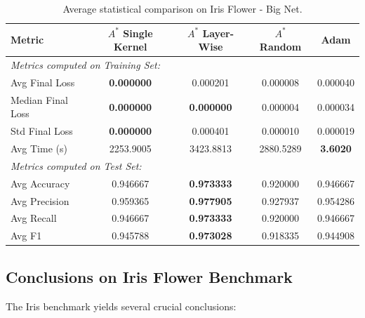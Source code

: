 \begin{table}[htbp]
\centering
\scriptsize
\begin{tabular}{|l|c|c|c|c|}
\hline
\textbf{Metric}   & \textbf{$A^*$ Single Kernel} & \textbf{$A^*$ Layer-Wise} & \textbf{$A^*$ Random} & \textbf{Adam} \\ \hline
\multicolumn{5}{|l|}{\textit{Metrics computed on Training Set:}} \\ \hline
Avg Final Loss          & \textbf{0.000000}            & 0.000201                  & 0.000008              & 0.000040      \\ 
Median Final Loss       & \textbf{0.000000}            & \textbf{0.000000}         & 0.000004              & 0.000034      \\
Std Final Loss          & \textbf{0.000000}            & 0.000401                  & 0.000010              & 0.000019      \\ \hline
Avg Time (s)            & 2253.9005                    & 3423.8813                 & 2880.5289             & \textbf{3.6020} \\ \hline
\multicolumn{5}{|l|}{\textit{Metrics computed on Test Set:}} \\ \hline
Avg Accuracy            & 0.946667                     & \textbf{0.973333}         & 0.920000              & 0.946667      \\ 
Avg Precision           & 0.959365                     & \textbf{0.977905}         & 0.927937              & 0.954286      \\ 
Avg Recall              & 0.946667                     & \textbf{0.973333}         & 0.920000              & 0.946667      \\ 
Avg F1                  & 0.945788                     & \textbf{0.973028}         & 0.918335              & 0.944908      \\ \hline
\end{tabular}
\caption{Average statistical comparison on Iris Flower - Big Net.}
\label{tab:big_net_iris}
\end{table}

\subsection{Conclusions on Iris Flower Benchmark}

The Iris benchmark yields several crucial conclusions:

